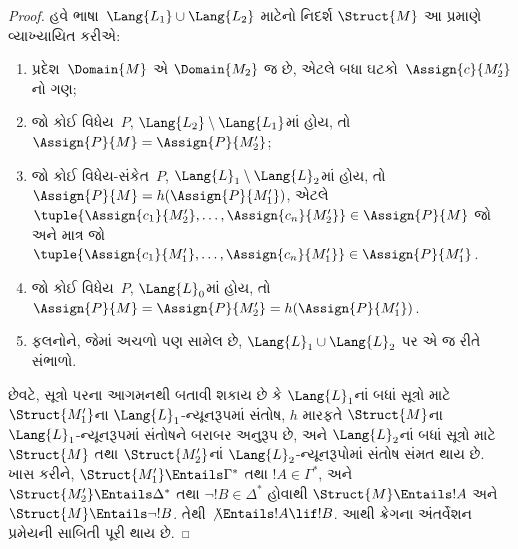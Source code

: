 \begin{proof}
હવે ભાષા~$\Lang{L_1}\cup\Lang{L_2}$ માટેનો નિદર્શ
$\Struct{M}$ આ પ્રમાણે વ્યાખ્યાયિત કરીએ:
\begin{enumerate}
\item પ્રદેશ~$\Domain{M}$ એ $\Domain{M_2}$ જ છે, એટલે બધા
  ઘટકો~$\Assign{c}{M'_2}$નો ગણ;
\item જો કોઈ વિધેય~$P$, $\Lang{L_2}\setminus\Lang{L_1}$માં
  હોય, તો $\Assign{P}{M}=\Assign{P}{M'_2}$;
\item જો કોઈ વિધેય-સંકેત~$P$, $\Lang{L}_1\setminus\Lang{L}_2$માં હોય, તો
  $\Assign{P}{M}=h(\Assign{P}{M'_1})$, એટલે
  $\tuple{\Assign{c_1}{M'_2},\dots,\Assign{c_n}{M'_2}}\in
  \Assign{P}{M}$ જો અને માત્ર જો
  $\tuple{\Assign{c_1}{M'_1},\dots,\Assign{c_n}{M'_1}}\in
  \Assign{P}{M'_1}$.
\item જો કોઈ વિધેય~$P$, $\Lang{L}_0$માં હોય, તો
  $\Assign{P}{M}=\Assign{P}{M'_2}=h(\Assign{P}{M'_1})$.
\item ફલનોને, જેમાં અચળો પણ સામેલ છે,
  $\Lang{L}_1\cup\Lang{L}_2$ પર એ જ રીતે સંભાળો.
\end{enumerate}

છેવટે, સૂત્રો પરના આગમનથી બતાવી શકાય છે કે $\Lang{L}_1$નાં
બધાં સૂત્રો માટે $\Struct{M'_1}$ના $\Lang{L}_1$-ન્યૂનરૂપમાં
સંતોષ, $h$ મારફતે $\Struct{M}$ના $\Lang{L}_1$-ન્યૂનરૂપમાં સંતોષને
બરાબર અનુરૂપ છે, અને $\Lang{L}_2$નાં બધાં સૂત્રો માટે
$\Struct{M}$ તથા $\Struct{M'_2}$નાં $\Lang{L}_2$-ન્યૂનરૂપોમાં સંતોષ
સંમત થાય છે. ખાસ કરીને,
$\Struct{M'_1}\Entails\Gamma^*$ તથા $!A\in\Gamma^*$, અને
$\Struct{M'_2}\Entails\Delta^*$ તથા $\lnot !B\in\Delta^*$ હોવાથી
$\Struct{M}\Entails !A$ અને $\Struct{M}\Entails\lnot !B$. તેથી
$\not\Entails !A\lif !B$. આથી ક્રેગના અંતર્વેશન પ્રમેયની સાબિતી
પૂરી થાય છે.
\end{proof}
\endgroup


